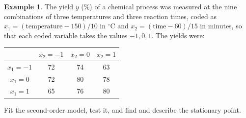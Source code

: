 \documentclass[11pt,a4paper]{article}
\numberwithin{equation}{section}
\theoremstyle{definition}
\newtheorem{exa}[thm]{Example}
\begin{document}
\begin{exa}\label{exa:process}
The yield $y$ (\%) of a chemical process was measured at the nine combinations of three temperatures and
three reaction times, coded as $x_1 = (\text{temperature} - 150)/10$ in $^\circ$C and $x_2 = (\text{time} - 60)/15$ in minutes, so
that each coded variable takes the values $-1, 0, 1$. The yields were:
\begin{center}
\begin{tabular}{c|ccc}
& $x_2 = -1$ & $x_2 = 0$ & $x_2 = 1$ \\
\hline
$x_1 = -1$ & 72 & 74 & 63 \\
$x_1 = 0$ & 72 & 80 & 78 \\
$x_1 = 1$ & 65 & 76 & 80 \\
\end{tabular}
\end{center}
Fit the second-order model, test it, and find and describe the stationary point.
\end{exa}
\end{document}
